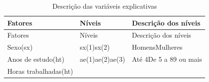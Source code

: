\documentclass[]{book}
\numberwithin{example}{chapter}
\numberwithin{remark}{chapter}
\numberwithin{definition}{chapter}
\begin{document}
\begin{longtable}[]{@{}lll@{}}
\caption{\label{tab:varexp}Descrição das variáveis
explicativas}\tabularnewline
\toprule
\begin{minipage}[b]{0.38\columnwidth}\raggedright\strut
Fatores\strut
\end{minipage} & \begin{minipage}[b]{0.10\columnwidth}\raggedright\strut
Níveis\strut
\end{minipage} & \begin{minipage}[b]{0.25\columnwidth}\raggedright\strut
Descrição dos níveis\strut
\end{minipage}\tabularnewline
\midrule
\endfirsthead
\toprule
\begin{minipage}[b]{0.38\columnwidth}\raggedright\strut
Fatores\strut
\end{minipage} & \begin{minipage}[b]{0.10\columnwidth}\raggedright\strut
Níveis\strut
\end{minipage} & \begin{minipage}[b]{0.25\columnwidth}\raggedright\strut
Descrição dos níveis\strut
\end{minipage}\tabularnewline
\midrule
\endhead
\begin{minipage}[t]{0.38\columnwidth}\raggedright\strut
Sexo(sx)\strut
\end{minipage} & \begin{minipage}[t]{0.10\columnwidth}\raggedright\strut
sx(1)sx(2)\strut
\end{minipage} & \begin{minipage}[t]{0.25\columnwidth}\raggedright\strut
HomensMulheres\strut
\end{minipage}\tabularnewline
\begin{minipage}[t]{0.38\columnwidth}\raggedright\strut
Anos de estudo(ht)\strut
\end{minipage} & \begin{minipage}[t]{0.10\columnwidth}\raggedright\strut
ae(1)ae(2)ae(3)\strut
\end{minipage} & \begin{minipage}[t]{0.25\columnwidth}\raggedright\strut
Até 4De 5 a 89 ou mais\strut
\end{minipage}\tabularnewline
\begin{minipage}[t]{0.38\columnwidth}\raggedright\strut
Horas trabalhadas(ht)\strut
\end{minipage} & \begin{minipage}[t]{0.10\columnwidth}\raggedright\strut

\end{minipage}
\end{longtable}
\end{document}
